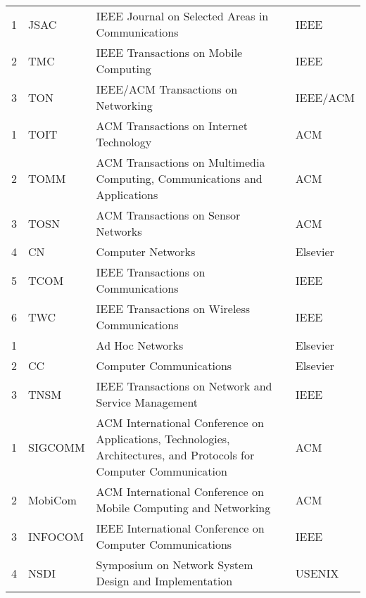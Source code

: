 \documentclass[print, doctor, vlined]{DissertUESTC}
\begin{document}
\begin{longtable}{m{2em}<{\centering} p{4.5em} p{15em} p{6em}}
		1 & JSAC & IEEE Journal on Selected Areas in Communications & IEEE \\
		2 & TMC & IEEE Transactions on Mobile Computing & IEEE \\
		3 & TON & IEEE/ACM Transactions on Networking & IEEE/ACM \\
		1 & TOIT & ACM Transactions on Internet Technology & ACM \\
		2 & TOMM & ACM Transactions on Multimedia Computing, Communications and Applications & ACM \\
		3 & TOSN & ACM Transactions on Sensor Networks & ACM \\
		4 & CN & Computer Networks & Elsevier \\
		5 & TCOM & IEEE Transactions on Communications & IEEE \\
		6 & TWC & IEEE Transactions on Wireless Communications & IEEE \\
		1 & & Ad Hoc Networks & Elsevier \\
		2 & CC & Computer Communications & Elsevier\tablenoteref{tn: 手动跨页表格附注标签Elsevier} \\
		3 & TNSM & IEEE Transactions on Network and Service Management & IEEE \\
		1 & SIGCOMM & ACM International Conference on Applications, Technologies, Architectures, and Protocols for Computer Communication & ACM \\
		2 & MobiCom & ACM International Conference on Mobile Computing and Networking & ACM \\
		3 & INFOCOM & IEEE International Conference on Computer Communications & IEEE \\
		4 & NSDI & Symposium on Network System Design and Implementation & USENIX\tablenoteref{tn: 手动跨页表格附注标签USENIX} \\

\end{longtable}
\end{document}
